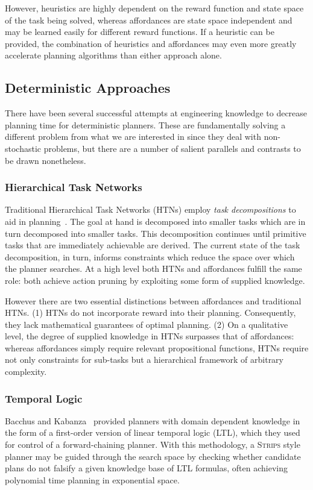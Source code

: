 \documentclass[letterpaper]{article}
\begin{document}
However, heuristics are highly dependent on the reward function and
state space of the task being solved, whereas affordances are state
space independent and may be learned easily for different reward
functions. If a heuristic can be provided, the combination of
heuristics and affordances may even more greatly accelerate planning
algorithms than either approach alone.

\subsection{Deterministic Approaches}

There have been several successful attempts at engineering knowledge
to decrease planning time for deterministic planners. These are
fundamentally solving a different problem from what we are interested
in since they deal with non-stochastic problems, but there are a
number of salient parallels and contrasts to be drawn nonetheless.

\subsubsection{Hierarchical Task Networks}
Traditional Hierarchical Task Networks (HTNs) employ \textit{task decompositions} to aid in planning~\cite{erol1994htn}. The goal at hand is decomposed into smaller tasks which are in turn decomposed into smaller tasks. This decomposition continues until primitive tasks that are immediately achievable are derived. The current state of the task decomposition, in turn, informs constraints which reduce the space over which the planner searches. At a high level both HTNs and affordances fulfill the same role: both achieve action pruning by exploiting some form of supplied knowledge. 

However there are two essential distinctions between affordances and traditional HTNs.  (1) HTNs do not incorporate reward into their planning. Consequently, they lack mathematical guarantees of optimal planning. (2) On a qualitative level, the degree of supplied knowledge in HTNs surpasses that of affordances: whereas affordances simply require relevant propositional functions, HTNs require not only constraints for sub-tasks but a hierarchical framework of arbitrary complexity.

\subsubsection{Temporal Logic}
Bacchus and Kabanza~\cite{Bacchus95usingtemporal,Bacchus99usingtemporal} provided
planners with domain dependent knowledge in the form of a first-order version of linear
temporal logic (LTL), which they used for control of a forward-chaining planner. With this methodology, 
a \textsc{Strips} style planner may be guided through the search space by checking 
whether candidate plans do not falsify a given knowledge base of LTL formulas, often
achieving polynomial time planning in exponential space.
\end{document}

